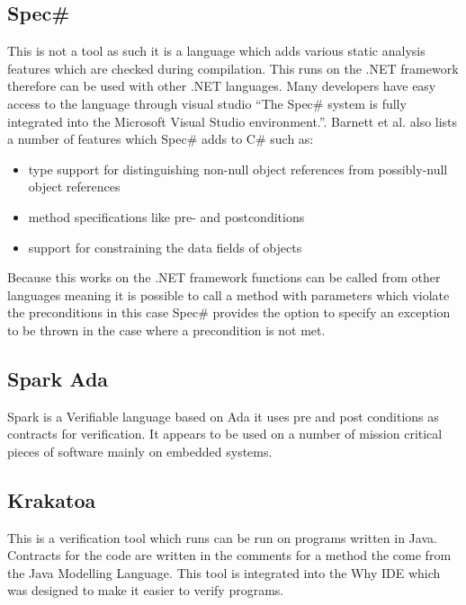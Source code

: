 \documentclass[a4paper,12pt]{scrartcl}
\begin{document}
{		\subsection{\texorpdfstring{Spec\#}{}}
		{
			This is not a tool as such it is a language which adds various static analysis features which are checked during compilation. This runs on the .NET framework therefore can be used with other .NET languages. Many developers have easy access to the language through visual studio \enquote{The Spec\# system is fully integrated into the Microsoft Visual Studio environment.}\cite{Barnett2005}. Barnett et al. also lists a number of features which Spec\# adds to C\# such as:
			\begin{itemize}
				\item{type support for distinguishing non-null object references from possibly-null object references}
				\item{method specifications like pre- and postconditions}
				\item{support for constraining the data fields of objects}
			\end{itemize}
			Because this works on the .NET framework functions can be called from other languages meaning it is possible to call a method with parameters which violate the preconditions in this case Spec\# provides the option to specify an exception to be thrown in the case where a precondition is not met.
		}
		\subsection{Spark Ada}
		{
			Spark is a Verifiable language based on Ada it uses pre and post conditions as contracts for verification. It appears to be used on a number of mission critical pieces of software mainly on embedded systems. 
		}
		\subsection{Krakatoa \cite{Marche2018,Filliatre2007}}\label{sec:krakatoa}
		{
			This is a verification tool which runs can be run on programs written in Java. Contracts for the code are written in the comments for a method the come from the Java Modelling Language\cite{Burdy2004}. This tool is integrated into the Why IDE which was designed to make it easier to verify programs.
		}
		
	}
\end{document}
